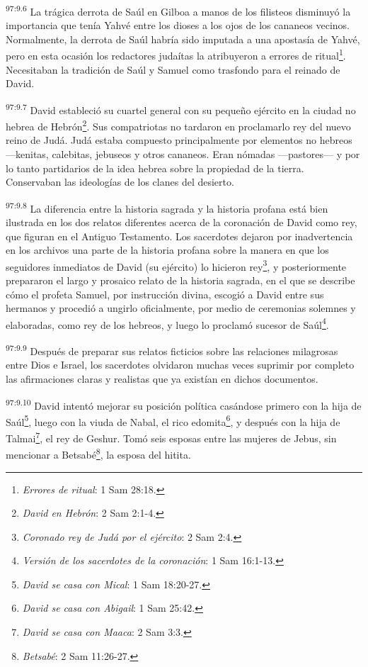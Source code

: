 \par
\textsuperscript{97:9.6} La trágica derrota de Saúl en Gilboa a manos de los filisteos disminuyó la importancia que tenía Yahvé entre los dioses a los ojos de los cananeos vecinos. Normalmente, la derrota de Saúl habría sido imputada a una apostasía de Yahvé, pero en esta ocasión los redactores judaítas la atribuyeron a errores de ritual\footnote{\textit{Errores de ritual}: 1 Sam 28:18.}. Necesitaban la tradición de Saúl y Samuel como trasfondo para el reinado de David.

\par
\textsuperscript{97:9.7} David estableció su cuartel general con su pequeño ejército en la ciudad no hebrea de Hebrón\footnote{\textit{David en Hebrón}: 2 Sam 2:1-4.}. Sus compatriotas no tardaron en proclamarlo rey del nuevo reino de Judá. Judá estaba compuesto principalmente por elementos no hebreos ---kenitas, calebitas, jebuseos y otros cananeos. Eran nómadas ---pastores--- y por lo tanto partidarios de la idea hebrea sobre la propiedad de la tierra. Conservaban las ideologías de los clanes del desierto.

\par
\textsuperscript{97:9.8} La diferencia entre la historia sagrada y la historia profana está bien ilustrada en los dos relatos diferentes acerca de la coronación de David como rey, que figuran en el Antiguo Testamento. Los sacerdotes dejaron por inadvertencia en los archivos una parte de la historia profana sobre la manera en que los seguidores inmediatos de David (su ejército) lo hicieron rey\footnote{\textit{Coronado rey de Judá por el ejército}: 2 Sam 2:4.}, y posteriormente prepararon el largo y prosaico relato de la historia sagrada, en el que se describe cómo el profeta Samuel, por instrucción divina, escogió a David entre sus hermanos y procedió a ungirlo oficialmente, por medio de ceremonias solemnes y elaboradas, como rey de los hebreos, y luego lo proclamó sucesor de Saúl\footnote{\textit{Versión de los sacerdotes de la coronación}: 1 Sam 16:1-13.}.

\par
\textsuperscript{97:9.9} Después de preparar sus relatos ficticios sobre las relaciones milagrosas entre Dios e Israel, los sacerdotes olvidaron muchas veces suprimir por completo las afirmaciones claras y realistas que ya existían en dichos documentos.

\par
\textsuperscript{97:9.10} David intentó mejorar su posición política casándose primero con la hija de Saúl\footnote{\textit{David se casa con Mical}: 1 Sam 18:20-27.}, luego con la viuda de Nabal, el rico edomita\footnote{\textit{David se casa con Abigail}: 1 Sam 25:42.}, y después con la hija de Talmai\footnote{\textit{David se casa con Maaca}: 2 Sam 3:3.}, el rey de Geshur. Tomó seis esposas entre las mujeres de Jebus, sin mencionar a Betsabé\footnote{\textit{Betsabé}: 2 Sam 11:26-27.}, la esposa del hitita.

